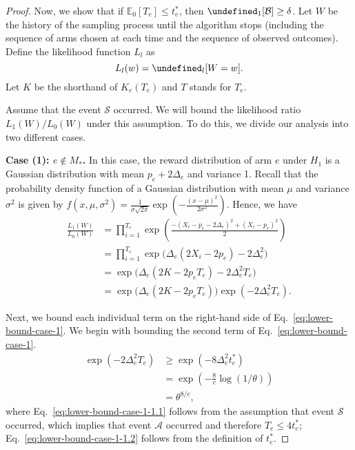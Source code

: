 \documentclass{article}
\newcommand{\E}{\mathbb E}
\let\Pr\undefined
\DeclareMathOperator{\Pr}{Pr}
\begin{document}
\begin{spacing}{1.1}
\begin{proof}
Now, we show that if $\E_0[T_e] \le t_e^*$, then $\Pr_1[\mathcal B] \ge \delta$.
Let $W$ be the history of the sampling process until the algorithm stops (including the sequence of arms chosen at each time and the sequence of observed outcomes).
Define the likelihood function $L_l$ as 
$$
L_l(w) = \Pr_l[W=w].
$$
Let $K$ be the shorthand of $K_e(T_e)$ and $T$ stands for $T_e$.

Assume that the event $\mathcal S$ occurred.
We will bound the likelihood ratio $L_1(W)/L_0(W)$ under this assumption. 
To do this, we divide our analysis into two different cases.

\textbf{Case (1): $e\not \in M_*$.}
In this case, the reward distribution of arm $e$ under $H_1$ is a Gaussian distribution with mean $p_e+2\Delta_e$ and variance 1. 
Recall that the probability density function of a Gaussian distribution with mean $\mu$ and variance $\sigma^2$ is given by
$f(x,\mu,\sigma^2)=\frac{1}{\sigma\sqrt{2\pi}}\exp\left(-\frac{(x-\mu)^2}{2\sigma^2}\right)$.
Hence, we have
\begin{align}
  \frac{L_1(W)}{L_0(W)} &= \prod_{i=1}^{T_e} \exp\left(\frac{-(X_i-p_e-2\Delta_e)^2+(X_i-p_e)^2}{2}\right) \nonumber \\
  						&= \prod_{i=1}^{T_e} \exp\big(\Delta_e(2X_i-2p_e)-2\Delta_e^2\big) \nonumber \\
  						&= \exp\big(\Delta_e(2K-2p_eT_e)-2\Delta_e^2T_e\big) \nonumber \\
  						&= \exp\big(\Delta_e(2K-2p_eT_e)\big)\exp(-2\Delta_e^2T_e) \label{eq:lower-bound-case-1}.
\end{align}

Next, we bound each individual term on the right-hand side of Eq.~\eqref{eq:lower-bound-case-1}.
We begin with bounding the second term of Eq.~\eqref{eq:lower-bound-case-1}.
\begin{align}
	\exp(-2\Delta_e^2T_e) &\ge \exp(-8\Delta_e^2t_e^*) \label{eq:lower-bound-case-1-1.1} \\
						  &=\exp\left(-\frac{8}{c}\log(1/\theta)\right) \label{eq:lower-bound-case-1-1.2}\\
						  &= \theta^{8/c}\label{eq:lower-bound-case-1-1.3},
\end{align}
where Eq.~\eqref{eq:lower-bound-case-1-1.1} follows from the assumption that event $\mathcal S$ occurred, which implies that event $\mathcal A$ occurred and therefore $T_e \le 4t_e^*$; Eq.~\eqref{eq:lower-bound-case-1-1.2} follows from the definition of $t_e^*$.


\end{proof}
\end{spacing}
\end{document}
